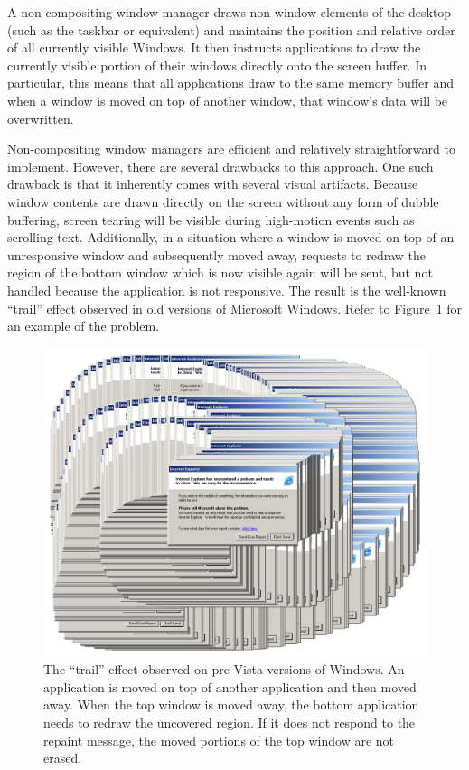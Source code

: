 \documentclass[10pt,twocolumn,a4paper,os=win]{article}
\begin{document}
			A non-compositing window manager draws non-window elements of the
			desktop (such as the taskbar or equivalent) and maintains the
			position and relative order of all currently visible Windows. It
			then instructs applications to draw the currently visible portion
			of their windows directly onto the screen buffer. In particular,
			this means that all applications draw to the same memory buffer and
			when a window is moved on top of another window, that window's data
			will be overwritten.

			Non-compositing window managers are efficient and relatively
			straightforward to implement. However, there are several drawbacks
			to this approach.  One such drawback is that it inherently comes
			with several visual artifacts. Because window contents are drawn
			directly on the screen without any form of dubble buffering, screen
			tearing will be visible during high-motion events such as scrolling
			text. Additionally, in a situation where a window is moved on top
			of an unresponsive window and subsequently moved away, requests to
			redraw the region of the bottom window which is now visible again
			will be sent, but not handled because the application is not
			responsive. The result is the well-known \enquote{trail} effect
			observed in old versions of Microsoft Windows. Refer to
			Figure~\ref{fig:trail} for an example of the problem.
			\begin{figure}[h]
				\centering
				\includegraphics[width=0.8\columnwidth]{trail}
				\caption{The \enquote{trail} effect observed on pre-Vista versions
					of Windows. An application is moved on top of another application
					and then moved away. When the top window is moved away, the bottom
					application needs to redraw the uncovered region. If it does not
					respond to the repaint message, the moved portions of the top
					window are not erased.}
				\label{fig:trail}
			\end{figure}
\end{document}
